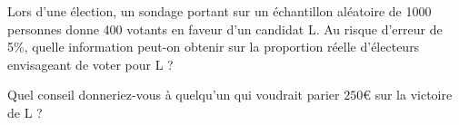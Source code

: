 
\begin{exercice}\label{exosmath-0441}


Lors d'une élection, un sondage portant sur un échantillon aléatoire de 1000 personnes donne 400 votants en faveur d’un candidat L. Au risque d'erreur de 5\%, quelle information peut-on obtenir sur la proportion réelle d'électeurs envisageant de voter pour L ?

Quel conseil donneriez-vous à quelqu'un qui voudrait parier \( 250\)€ sur la victoire de L ?

\end{exercice}
